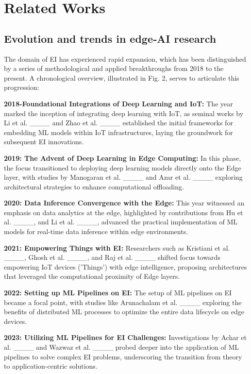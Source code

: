 \section{Related Works}
\label{Related Works}
	\subsection{ Evolution and trends in edge‑AI research }
	The domain of EI has experienced rapid expansion, which has been distinguished
	by a series of methodological and applied breakthroughs from 2018 to the present.
	A chronological overview, illustrated in Fig. 2, serves to articulate this progression:
	
	\textbf{2018-Foundational Integrations of Deep Learning and IoT:} The year marked the inception of integrating deep learning with IoT, as seminal works by Li et al. ____ and Zhao et al. ____ established the initial frameworks for embedding ML models within IoT infrastructures, laying the groundwork for subsequent EI innovations.
	
	\textbf{2019: The Advent of Deep Learning in Edge Computing:} In this phase, the focus transitioned to deploying deep learning models directly onto the Edge layer, with studies by Manogaran et al. ____ and Azar et al. ____ exploring architectural strategies to enhance computational offloading.
	
	\textbf{2020: Data Inference Convergence with the Edge:} This year witnessed an emphasis on data analytics at the edge, highlighted by contributions from Hu et al. ____, and Li et al. ____, advanced the practical implementation of ML models for real-time data inference within edge environments.
	
	\textbf{2021: Empowering Things with EI:} Researchers such as Kristiani et al. ____, Ghosh et al. ____, and Raj et al. ____ shifted focus towards empowering IoT devices ('Things') with edge intelligence, proposing architectures that leveraged the computational proximity of Edge layers.
	
	\textbf{2022: Setting up ML Pipelines on EI:} The setup of ML pipelines on EI became a focal point, with studies like Arunachalam et al. ____ exploring the benefits of distributed ML processes to optimize the entire data lifecycle on edge devices.
	
	\textbf{2023: Utilizing ML Pipelines for EI Challenges:} Investigations by Achar et al. ____ and Wazwaz et al. ____ probed deeper into the application of ML pipelines to solve complex EI problems, underscoring the transition from theory to application-centric solutions.
	
